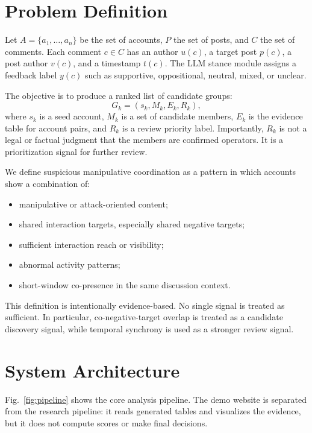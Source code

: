 \documentclass[conference]{IEEEtran}
\begin{document}
\section{Problem Definition}

Let $A=\{a_1,\ldots,a_n\}$ be the set of accounts, $P$ the set of posts, and
$C$ the set of comments. Each comment $c \in C$ has an author $u(c)$, a target
post $p(c)$, a post author $v(c)$, and a timestamp $t(c)$. The LLM stance
module assigns a feedback label $y(c)$ such as supportive, oppositional,
neutral, mixed, or unclear.

The objective is to produce a ranked list of candidate groups:
\begin{equation}
G_k = (s_k, M_k, E_k, R_k),
\end{equation}
where $s_k$ is a seed account, $M_k$ is a set of candidate members, $E_k$ is
the evidence table for account pairs, and $R_k$ is a review priority label.
Importantly, $R_k$ is not a legal or factual judgment that the members are
confirmed operators. It is a prioritization signal for further review.

We define suspicious manipulative coordination as a pattern in which accounts
show a combination of:
\begin{itemize}
  \item manipulative or attack-oriented content;
  \item shared interaction targets, especially shared negative targets;
  \item sufficient interaction reach or visibility;
  \item abnormal activity patterns;
  \item short-window co-presence in the same discussion context.
\end{itemize}

This definition is intentionally evidence-based. No single signal is treated
as sufficient. In particular, co-negative-target overlap is treated as a
candidate discovery signal, while temporal synchrony is used as a stronger
review signal.

\section{System Architecture}

Fig.~\ref{fig:pipeline} shows the core analysis pipeline. The demo website is
separated from the research pipeline: it reads generated tables and visualizes
the evidence, but it does not compute scores or make final decisions.
\end{document}
